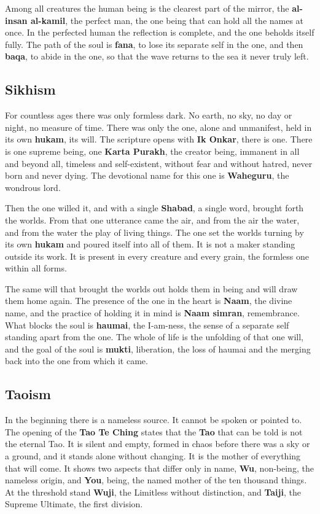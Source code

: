 Among all creatures the human being is the clearest part of the mirror, the \textbf{al-insan al-kamil}, the perfect man, the one being that can hold all the names at once. In the perfected human the reflection is complete, and the one beholds itself fully. The path of the soul is \textbf{fana}, to lose its separate self in the one, and then \textbf{baqa}, to abide in the one, so that the wave returns to the sea it never truly left.

\subsection{Sikhism}

For countless ages there was only formless dark. No earth, no sky, no day or night, no measure of time. There was only the one, alone and unmanifest, held in its own \textbf{hukam}, its will. The scripture opens with \textbf{Ik Onkar}, there is one. There is one supreme being, one \textbf{Karta Purakh}, the creator being, immanent in all and beyond all, timeless and self-existent, without fear and without hatred, never born and never dying. The devotional name for this one is \textbf{Waheguru}, the wondrous lord.

Then the one willed it, and with a single \textbf{Shabad}, a single word, brought forth the worlds. From that one utterance came the air, and from the air the water, and from the water the play of living things. The one set the worlds turning by its own \textbf{hukam} and poured itself into all of them. It is not a maker standing outside its work. It is present in every creature and every grain, the formless one within all forms.

The same will that brought the worlds out holds them in being and will draw them home again. The presence of the one in the heart is \textbf{Naam}, the divine name, and the practice of holding it in mind is \textbf{Naam simran}, remembrance. What blocks the soul is \textbf{haumai}, the I-am-ness, the sense of a separate self standing apart from the one. The whole of life is the unfolding of that one will, and the goal of the soul is \textbf{mukti}, liberation, the loss of haumai and the merging back into the one from which it came.

\subsection{Taoism}

In the beginning there is a nameless source. It cannot be spoken or pointed to. The opening of the \textbf{Tao Te Ching} states that the \textbf{Tao} that can be told is not the eternal Tao. It is silent and empty, formed in chaos before there was a sky or a ground, and it stands alone without changing. It is the mother of everything that will come. It shows two aspects that differ only in name, \textbf{Wu}, non-being, the nameless origin, and \textbf{You}, being, the named mother of the ten thousand things. At the threshold stand \textbf{Wuji}, the Limitless without distinction, and \textbf{Taiji}, the Supreme Ultimate, the first division.

